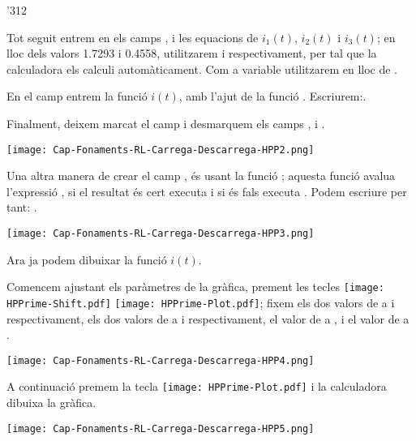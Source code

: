 \begin{exemple}
\begin{dingautolist}{'312}
        \item Tot seguit entrem en els camps ,  i  les equacions de $i_1(t)$, $i_2(t)$ i $i_3(t)$; en lloc dels valors \num{1,7293} i  \num{0,4558}, utilitzarem  i  respectivament, per tal que la calculadora els calculi automàticament. Com a variable utilitzarem  en lloc de .

            En el camp  entrem la funció $i(t)$, amb l'ajut de la funció  . Escriurem:\break {}.

            Finalment, deixem marcat el camp  i desmarquem els camps ,  i .

            \texttt{[image: Cap-Fonaments-RL-Carrega-Descarrega-HPP2.png]}

            Una altra manera de crear el camp , és usant la funció ; aquesta funció avalua l'expressió , si el resultat   és cert executa  i si és fals executa . Podem escriure per tant: .

            \texttt{[image: Cap-Fonaments-RL-Carrega-Descarrega-HPP3.png]}

        \item Ara ja podem dibuixar la funció $i(t)$.

            Comencem ajustant els paràmetres de la gràfica, prement les tecles \texttt{[image: HPPrime-Shift.pdf]} \texttt{[image: HPPrime-Plot.pdf]}; fixem els dos valors de  a  i  respectivament, els dos valors de  a  i  respectivament, el valor de  a , i el valor de  a .

            \texttt{[image: Cap-Fonaments-RL-Carrega-Descarrega-HPP4.png]}

        \item A continuació premem la tecla \texttt{[image: HPPrime-Plot.pdf]} i la calculadora dibuixa la gràfica.

            \texttt{[image: Cap-Fonaments-RL-Carrega-Descarrega-HPP5.png]}
    \end{dingautolist}
\end{exemple}


